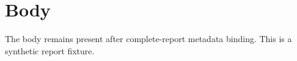 \chapter*{Body}
The body remains present after complete-report metadata binding. This is a synthetic \VIT report fixture.
